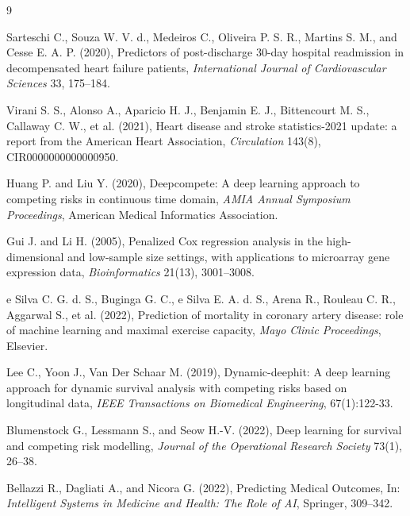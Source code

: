 \documentclass[twoside]{article}
\begin{document}
\begin{thebibliography}{9}

Sarteschi C., Souza W. V. d., Medeiros C., Oliveira P. S. R., Martins S. M., and Cesse E. A. P. (2020),
Predictors of post-discharge 30-day hospital readmission in decompensated heart failure patients,
{\it International Journal of Cardiovascular Sciences} 33, 175--184.

Virani S. S., Alonso A., Aparicio H. J., Benjamin E. J., Bittencourt M. S., Callaway C. W., et al. (2021),
Heart disease and stroke statistics-2021 update: a report from the American Heart Association,
{\it Circulation} 143(8), CIR0000000000000950.

Huang P. and Liu Y. (2020),
Deepcompete: A deep learning approach to competing risks in continuous time domain,
{\it AMIA Annual Symposium Proceedings}, American Medical Informatics Association.

Gui J. and Li H. (2005),
Penalized Cox regression analysis in the high-dimensional and low-sample size settings, with applications to microarray gene expression data,
{\it Bioinformatics} 21(13), 3001--3008.

e Silva C. G. d. S., Buginga G. C., e Silva E. A. d. S., Arena R., Rouleau C. R., Aggarwal S., et al. (2022),
Prediction of mortality in coronary artery disease: role of machine learning and maximal exercise capacity,
{\it Mayo Clinic Proceedings}, Elsevier.

Lee C., Yoon J., Van Der Schaar M. (2019), Dynamic-deephit: A deep learning approach for dynamic survival analysis with competing risks based on longitudinal data, {\it IEEE Transactions on Biomedical Engineering}, 67(1):122-33.

Blumenstock G., Lessmann S., and Seow H.-V. (2022),
Deep learning for survival and competing risk modelling,
{\it Journal of the Operational Research Society} 73(1), 26--38.

Bellazzi R., Dagliati A., and Nicora G. (2022),
Predicting Medical Outcomes,
In: {\it Intelligent Systems in Medicine and Health: The Role of AI}, Springer, 309--342.


\end{thebibliography}
\end{document}
